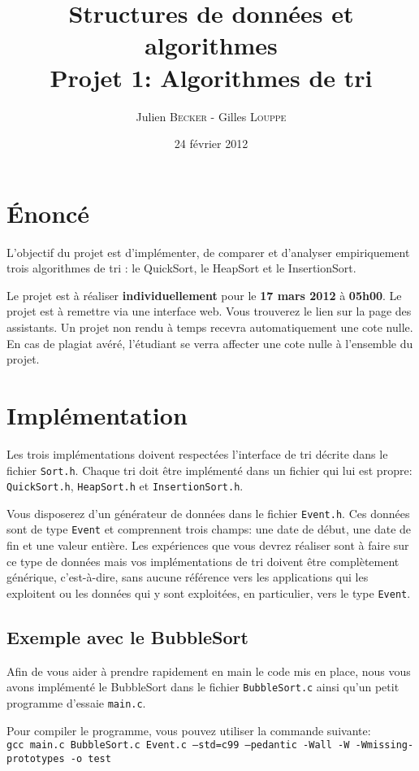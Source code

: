 \documentclass[a4paper,10pt]{article}
\title{
    \textbf{Structures de données et algorithmes}\\
    Projet 1: Algorithmes de tri
}
\author{Julien \textsc{Becker} - Gilles \textsc{Louppe}}
\date{24 février 2012}
\begin{document}
\maketitle

\section*{\'Enoncé}

L'objectif du projet est d'implémenter, de comparer et d'analyser empiriquement
trois algorithmes de tri : le QuickSort, le HeapSort et le InsertionSort.

Le projet est à réaliser {\bf individuellement} pour le {\bf 17 mars 2012} à
{\bf 05h00}. Le projet est à remettre via une interface web. Vous trouverez le
lien sur la page des assistants. Un projet non rendu à temps recevra
automatiquement une cote nulle. En cas de plagiat avéré, l'étudiant se verra
affecter une cote nulle à l'ensemble du projet.

\section*{Implémentation}

Les trois implémentations doivent respectées l'interface de tri décrite dans le
fichier \texttt{Sort.h}. Chaque tri doit être implémenté dans un fichier qui lui
est propre: \texttt{QuickSort.h}, \texttt{HeapSort.h} et
\texttt{InsertionSort.h}.

Vous disposerez d'un générateur de données dans le fichier \texttt{Event.h}. Ces
données sont de type \texttt{Event} et comprennent trois champs: une date de
début, une date de fin et une valeur entière. Les expériences que vous devrez
réaliser sont à faire sur ce type de données mais vos implémentations de tri
doivent être complètement générique, c'est-à-dire, sans aucune référence vers
les applications qui les exploitent ou les données qui y sont exploitées, en
particulier, vers le type \texttt{Event}.

\subsection*{Exemple avec le BubbleSort}

Afin de vous aider à prendre rapidement en main le code mis en place, nous vous
avons implémenté le BubbleSort dans le fichier \texttt{BubbleSort.c} ainsi qu'un
petit programme d'essaie \texttt{main.c}.

Pour compiler le programme, vous pouvez utiliser la commande suivante: \\ \texttt{gcc
main.c BubbleSort.c Event.c --std=c99 --pedantic -Wall -W -Wmissing-prototypes
-o test}
\end{document}
